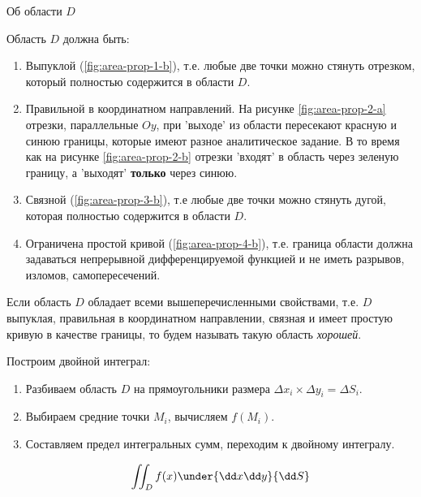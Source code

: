 
\setlength{\columnseprule}{1pt}
\begin{twocolumns}
  
  

  \columnbreak

  
  
\end{twocolumns}
\setlength{\columnseprule}{0pt}

\begin{remark}
  Об области \(D\)

  Область \(D\) должна быть:
  \begin{enumerate}
    \item Выпуклой (\ref{fig:area-prop-1-b}), т.е. любые две точки можно стянуть
    отрезком, который полностью содержится в области \(D\).

    \item Правильной в координатном направлений. На рисунке
    \ref{fig:area-prop-2-a} отрезки, параллельные \(Oy\), при 'выходе' из
    области пересекают красную и синюю границы, которые имеют разное
    аналитическое задание. В то время как на рисунке \ref{fig:area-prop-2-b}
    отрезки 'входят' в область через зеленую границу, а 'выходят'
    \textbf{только} через синюю.

    \item Связной (\ref{fig:area-prop-3-b}), т.е любые две точки можно стянуть
    дугой, которая полностью содержится в области \(D\).

    \item Ограничена простой кривой (\ref{fig:area-prop-4-b}), т.е. граница
    области должна задаваться непрерывной дифференцируемой функцией и не иметь
    разрывов, изломов, самопересечений.
  \end{enumerate}
\end{remark}

\begin{remark}\label{area-good-def}
  Если область \(D\) обладает всеми вышеперечисленными свойствами, т.е. \(D\)
  выпуклая, правильная в координатном направлении, связная и имеет простую
  кривую в качестве границы, то будем называть такую область \textit{хорошей}.
\end{remark}

Построим двойной интеграл:
\begin{enumerate}
  \item Разбиваем область \(D\) на прямоугольники размера
  \(\Delta x_{i} \times \Delta y_{i} = \Delta S_{i}\).

  \item Выбираем средние точки \(M_{i}\), вычисляем \(f(M_{i})\).
  
  \item Составляем предел интегральных сумм, переходим к двойному интегралу.
  
  \begin{align*}
    \iint_{D} f(x) \under{\dd x \dd y}{\dd S}
  \end{align*}
\end{enumerate}

